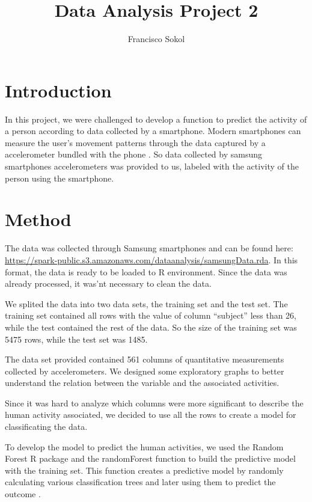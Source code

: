 \documentclass[IEEEtran]{IEEEtran}
\begin{document}
\title{Data Analysis Project 2}
\author{Francisco Sokol}

\maketitle

\IEEEpeerreviewmaketitle

\section{Introduction}

In this project, we were challenged to develop a function to predict the
activity of a person according to data collected by a smartphone. Modern
smartphones can measure the user's movement patterns through the data captured
by a accelerometer bundled with the phone \cite{acelerometro}. So data collected by samsung
smartphones accelerometers was provided to us, labeled with the activity of the
person using the smartphone.

\section{Method}

The data was collected through Samsung smartphones and can be found here:
\url{https://spark-public.s3.amazonaws.com/dataanalysis/samsungData.rda}. In
this format, the data is ready to be loaded to R environment. Since the data
was already processed, it was'nt necessary to clean the data.

We splited the data into two data sets, the training set and the test set. The
training set contained all rows with the value of column ``subject'' less than
26, while the test contained the rest of the data. So the size of the training
set was 5475 rows, while the test set was 1485.

The data set provided contained 561 columns of quantitative measurements
collected by accelerometers. We designed some exploratory graphs to better
understand the relation between the variable and the associated activities.

Since it was hard to analyze which columns were more significant to describe
the human activity associated, we decided to use all the rows to create a model
for classificating the data.

To develop the model to predict the human activities, we used the Random Forest
R package and the randomForest function to build the predictive model with the
training set. This function creates a predictive model by randomly calculating
various classification trees and later using them to predict the outcome
\cite{random-forest}.
\end{document}
